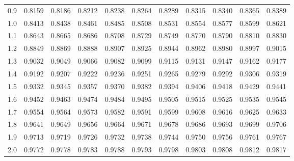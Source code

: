\documentclass{article}
\begin{document}
\begin{center}
\begin{tabular}{lllllllllll}
0.9 & 0.8159 & 0.8186 & 0.8212 & 0.8238 & 0.8264 & 0.8289 & 0.8315 & 0.8340 & 0.8365 & 0.8389 \\
1.0 & \cellcolor{gray!20}0.8413 & \cellcolor{gray!20}0.8438 & \cellcolor{gray!20}0.8461 & \cellcolor{gray!20}0.8485 & \cellcolor{gray!20}0.8508 & \cellcolor{gray!20}0.8531 & \cellcolor{gray!20}0.8554 & \cellcolor{gray!20}0.8577 & \cellcolor{gray!20}0.8599 & \cellcolor{gray!20}0.8621 \\
1.1 & 0.8643 & 0.8665 & 0.8686 & 0.8708 & 0.8729 & 0.8749 & 0.8770 & 0.8790 & 0.8810 & 0.8830 \\
1.2 & \cellcolor{gray!20}0.8849 & \cellcolor{gray!20}0.8869 & \cellcolor{gray!20}0.8888 & \cellcolor{gray!20}0.8907 & \cellcolor{gray!20}0.8925 & \cellcolor{gray!20}0.8944 & \cellcolor{gray!20}0.8962 & \cellcolor{gray!20}0.8980 & \cellcolor{gray!20}0.8997 & \cellcolor{gray!20}0.9015 \\
1.3 & 0.9032 & 0.9049 & 0.9066 & 0.9082 & 0.9099 & 0.9115 & 0.9131 & 0.9147 & 0.9162 & 0.9177 \\
1.4 & \cellcolor{gray!20}0.9192 & \cellcolor{gray!20}0.9207 & \cellcolor{gray!20}0.9222 & \cellcolor{gray!20}0.9236 & \cellcolor{gray!20}0.9251 & \cellcolor{gray!20}0.9265 & \cellcolor{gray!20}0.9279 & \cellcolor{gray!20}0.9292 & \cellcolor{gray!20}0.9306 & \cellcolor{gray!20}0.9319 \\
1.5 & 0.9332 & 0.9345 & 0.9357 & 0.9370 & 0.9382 & 0.9394 & 0.9406 & 0.9418 & 0.9429 & 0.9441 \\
1.6 & \cellcolor{gray!20}0.9452 & \cellcolor{gray!20}0.9463 & \cellcolor{gray!20}0.9474 & \cellcolor{gray!20}0.9484 & \cellcolor{gray!20}0.9495 & \cellcolor{gray!20}0.9505 & \cellcolor{gray!20}0.9515 & \cellcolor{gray!20}0.9525 & \cellcolor{gray!20}0.9535 & \cellcolor{gray!20}0.9545 \\
1.7 & 0.9554 & 0.9564 & 0.9573 & 0.9582 & 0.9591 & 0.9599 & 0.9608 & 0.9616 & 0.9625 & 0.9633 \\
1.8 & \cellcolor{gray!20}0.9641 & \cellcolor{gray!20}0.9649 & \cellcolor{gray!20}0.9656 & \cellcolor{gray!20}0.9664 & \cellcolor{gray!20}0.9671 & \cellcolor{gray!20}0.9678 & \cellcolor{gray!20}0.9686 & \cellcolor{gray!20}0.9693 & \cellcolor{gray!20}0.9699 & \cellcolor{gray!20}0.9706 \\
1.9 & 0.9713 & 0.9719 & 0.9726 & 0.9732 & 0.9738 & 0.9744 & 0.9750 & 0.9756 & 0.9761 & 0.9767 \\
2.0 & \cellcolor{gray!20}0.9772 & \cellcolor{gray!20}0.9778 & \cellcolor{gray!20}0.9783 & \cellcolor{gray!20}0.9788 & \cellcolor{gray!20}0.9793 & \cellcolor{gray!20}0.9798 & \cellcolor{gray!20}0.9803 & \cellcolor{gray!20}0.9808 & \cellcolor{gray!20}0.9812 & \cellcolor{gray!20}0.9817 \\

\end{tabular}
\end{center}
\end{document}
